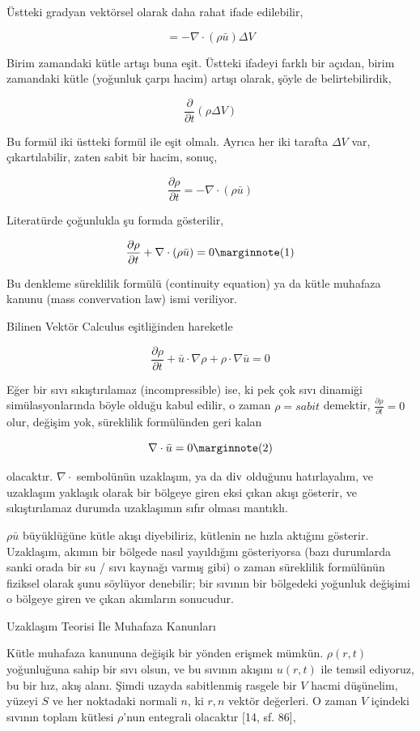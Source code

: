 \documentclass[12pt,fleqn]{article}\usepackage{../../common}
\begin{document}
Üstteki gradyan vektörsel olarak daha rahat ifade edilebilir,

$$
= -\nabla \cdot (\rho \bar{u} ) \Delta V
$$

Birim zamandaki kütle artışı buna eşit. Üstteki ifadeyi farklı bir açıdan, birim
zamandaki kütle (yoğunluk çarpı hacim) artışı olarak, şöyle de belirtebilirdik,

$$
\frac{\partial }{\partial t} (\rho \Delta V) 
$$

Bu formül iki üstteki formül ile eşit olmalı. Ayrıca her iki tarafta $\Delta V$
var, çıkartılabilir, zaten sabit bir hacim, sonuç,

$$
\frac{\partial \rho}{\partial t}  = -\nabla \cdot (\rho \bar{u} )
$$

Literatürde çoğunlukla şu formda gösterilir,

$$
\frac{\partial \rho}{\partial t}  + \nabla \cdot (\rho \bar{u} ) = 0
\mlabel{1}
$$

Bu denkleme süreklilik formülü (continuity equation) ya da kütle muhafaza kanunu
(mass convervation law) ismi veriliyor.

Bilinen Vektör Calculus eşitliğinden hareketle

$$
\frac{\partial \rho}{\partial t}  +
\bar{u} \cdot \nabla \rho +
\rho \cdot \nabla \bar{u} = 0
$$

Eğer bir sıvı sıkıştırılamaz (incompressible) ise, ki pek çok sıvı dinamiği
simülasyonlarında böyle olduğu kabul edilir, o zaman $\rho = sabit$ demektir,
$\frac{\partial \rho}{\partial t} = 0$ olur, değişim yok, süreklilik
formülünden geri kalan

$$
\nabla \cdot \bar{u} = 0
\mlabel{2}
$$

olacaktır. $\nabla \cdot$ sembolünün uzaklaşım, ya da $\operatorname{div}$ olduğunu
hatırlayalım, ve uzaklaşım yaklaşık olarak bir bölgeye giren eksi çıkan akışı
gösterir, ve sıkıştırılamaz durumda uzaklaşımın sıfır olması mantıklı.

$\rho \bar{u}$ büyüklüğüne kütle akışı diyebiliriz, kütlenin ne hızla aktığını
gösterir. Uzaklaşım, akımın bir bölgede nasıl yayıldığını gösteriyorsa (bazı
durumlarda sanki orada bir su / sıvı kaynağı varmış gibi) o zaman süreklilik
formülünün fiziksel olarak şunu söylüyor denebilir; bir sıvının bir bölgedeki
yoğunluk değişimi o bölgeye giren ve çıkan akımların sonucudur.

Uzaklaşım Teorisi İle Muhafaza Kanunları

Kütle muhafaza kanununa değişik bir yönden erişmek mümkün. $\rho(r, t)$
yoğunluğuna sahip bir sıvı olsun, ve bu sıvının akışını $u(r, t)$ ile temsil
ediyoruz, bu bir hız, akış alanı. Şimdi uzayda sabitlenmiş rasgele bir $V$ hacmi
düşünelim, yüzeyi $S$ ve her noktadaki normali $n$, ki $r,n$ vektör değerleri. O
zaman $V$ içindeki sıvının toplam kütlesi $\rho$'nun entegrali olacaktır [14, sf. 86],
\end{document}
